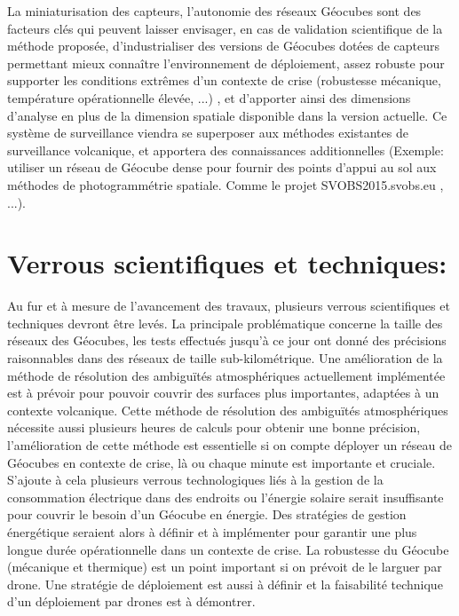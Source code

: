 \documentclass{themeensg}
\begin{document}
\begin{appendices}
La miniaturisation des capteurs, l'autonomie des réseaux Géocubes sont des facteurs clés qui peuvent laisser envisager, en cas de validation scientifique de la méthode proposée, d'industrialiser des versions de Géocubes dotées de capteurs permettant mieux connaître l'environnement de déploiement, assez robuste pour supporter les conditions extrêmes d'un contexte de crise (robustesse mécanique, température opérationnelle élevée, ...) , et d'apporter ainsi des dimensions d'analyse en plus de la dimension spatiale disponible dans la version actuelle. Ce système de surveillance viendra se superposer aux méthodes existantes de surveillance volcanique, et apportera des connaissances additionnelles (Exemple: utiliser un réseau de Géocube dense pour fournir des points d'appui au sol aux méthodes de photogrammétrie spatiale. Comme le projet SVOBS2015.svobs.eu , ...).

\section*{Verrous scientifiques et techniques:}

Au fur et à mesure de l'avancement des travaux, plusieurs verrous scientifiques et techniques devront être levés. La principale problématique concerne la taille des réseaux des Géocubes, les tests effectués jusqu'à ce jour ont donné des précisions raisonnables dans des réseaux de taille sub-kilométrique. Une amélioration de la méthode de résolution des ambiguïtés atmosphériques actuellement implémentée est à prévoir pour pouvoir couvrir des surfaces plus importantes, adaptées à un contexte volcanique. Cette méthode de résolution des ambiguïtés atmosphériques nécessite aussi plusieurs heures de calculs pour obtenir une bonne précision, l'amélioration de cette méthode est essentielle si on compte déployer un réseau de Géocubes en contexte de crise, là ou chaque minute est importante et cruciale. S'ajoute à cela plusieurs verrous technologiques liés à la gestion de la consommation électrique dans des endroits ou l'énergie solaire serait insuffisante pour couvrir le besoin d'un Géocube en énergie. Des stratégies de gestion énergétique seraient alors à définir et à implémenter pour garantir une plus longue durée opérationnelle dans un contexte de crise. La robustesse du Géocube (mécanique et thermique) est un point important si on prévoit de le larguer par drone. Une stratégie de déploiement est aussi à définir et la faisabilité technique d'un déploiement par drones est à démontrer.


\end{appendices}
\end{document}
